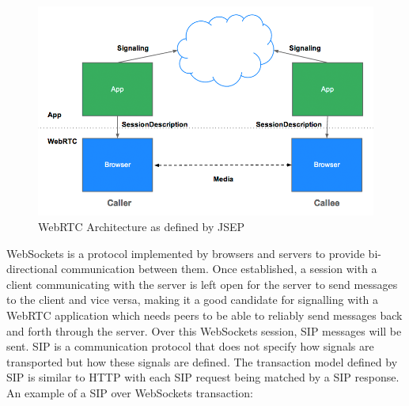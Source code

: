 \documentclass[]{report}
\begin{document}
	\begin{figure}[H]
		\caption{WebRTC Architecture as defined by JSEP \cite{JSEP}}
		\includegraphics[scale=0.4]{jsep.png}
	\end{figure}
	
	WebSockets is a protocol implemented by browsers and servers to provide bi-directional communication between them\cite{WebSockets}. Once established, a session with a client communicating with the server is left open for the server to send messages to the client and vice versa, making it a good candidate for signalling with a WebRTC application which needs peers to be able to reliably send messages back and forth through the server. Over this WebSockets session, SIP messages will be sent. SIP is a communication protocol that does not specify how signals are transported but how these signals are defined. The transaction model defined by SIP is similar to HTTP with each SIP request being matched by a SIP response. An example of a SIP over WebSockets transaction:\cite{SIP Over WebSockets}
	
\end{document}
